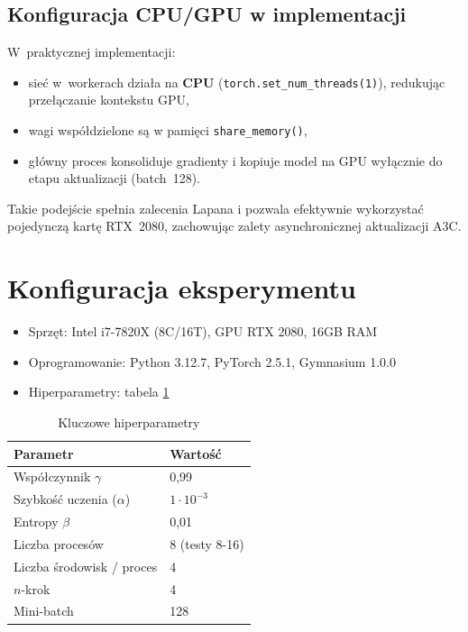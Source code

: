 \documentclass[12pt,a4paper]{article}
\begin{document}
\subsection{Konfiguracja CPU/GPU w implementacji}

W~praktycznej implementacji:
\begin{itemize}
  \item sieć w~workerach działa na \textbf{CPU}  
        (\texttt{torch.set\_num\_threads(1)}), redukując
        przełączanie kontekstu GPU,
  \item wagi współdzielone są w pamięci \texttt{share\_memory()},
  \item główny proces konsoliduje gradienty i kopiuje model
        na GPU wyłącznie do etapu aktualizacji (batch~128).
\end{itemize}

Takie podejście spełnia zalecenia Lapana \cite{Lapan2018}
i pozwala efektywnie wykorzystać pojedynczą kartę RTX~2080,
zachowując zalety asynchronicznej aktualizacji A3C.


\section{Konfiguracja eksperymentu}
\begin{itemize}
  \item Sprzęt: Intel i7-7820X (8C/16T), GPU RTX 2080, 16GB RAM
  \item Oprogramowanie: Python 3.12.7, PyTorch 2.5.1, Gymnasium 1.0.0
  \item Hiperparametry: tabela \ref{tab:hparams}
\end{itemize}

\begin{table}[h]
  \centering
  \caption{Kluczowe hiperparametry}
  \label{tab:hparams}
  \begin{tabular}{@{}ll@{}}
    \toprule
    Parametr & Wartość \\ \midrule
    Współczynnik \(\gamma\) & 0{,}99 \\
    Szybkość uczenia (\( \alpha \)) & \(1\cdot10^{-3}\) \\
    Entropy \(\beta\) & 0{,}01 \\
    Liczba procesów & 8 (testy 8-16) \\
    Liczba środowisk / proces & 4 \\ 
    \(n\)-krok & 4 \\ 
    Mini-batch & 128 \\ 
    \bottomrule
  \end{tabular}
\end{table}
\end{document}
